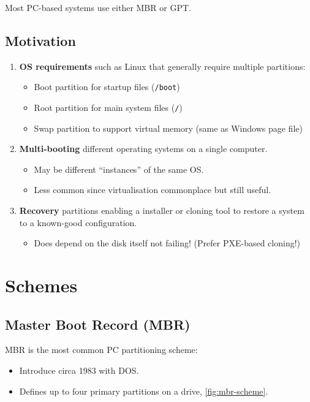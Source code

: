 \documentclass[slides]{pgnotes}
\begin{document}
Most PC-based systems use either MBR or GPT.

\subsection{Motivation}

\begin{enumerate}
\item \textbf{OS requirements} such as Linux that generally require multiple partitions:
  \begin{itemize}
  \item Boot partition for startup files (\texttt{/boot})
  \item Root partition for main system files (\texttt{/})
  \item Swap partition to support virtual memory (same as Windows page file)
  \end{itemize}
\item \textbf{Multi-booting} different operating systems on a single computer.
  \begin{itemize}
  \item May be different ``instances'' of the same OS.
  \item Less common since virtualisation commonplace but still useful.
  \end{itemize}
\item \textbf{Recovery} partitions enabling a installer or cloning tool to restore a system to a known-good configuration.
  \begin{itemize}
  \item Does depend on the disk itself not failing! (Prefer PXE-based cloning!)
  \end{itemize}

\end{enumerate}

\section{Schemes}

\subsection{Master Boot Record (MBR)}
\label{sec:master-boot-record-mbr}

MBR is the most common PC partitioning scheme:
\begin{itemize}
\item Introduce circa 1983 with DOS.
\item Defines up to four primary partitions on a drive, \autoref{fig:mbr-scheme}.
\end{itemize}
\end{document}

